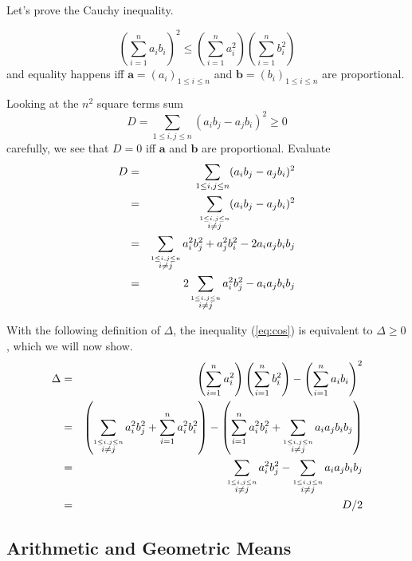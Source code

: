 Let's prove the Cauchy inequality.
\begin{thm} \label{thm:cauchy}
\begin{equation} \label{eq:cos}
 \left(\sum_{i=1}^n a_i b_i\right)^2 \leq
 \left(\sum_{i=1}^n a_i^2\right)
 \left(\sum_{i=1}^n b_i^2\right)
\end{equation}
and equality happens iff
\(\mathbf{a}=(a_i)_{1\leq i\leq n}\)
and
\(\mathbf{b}=(b_i)_{1\leq i\leq n}\)
are proportional.
\end{thm}
\begin{thmproof}
Looking at the \(n^2\) square terms sum
\begin{equation}
D = \sum_{1\leq i,j \leq n} (a_i b_j - a_j b_i)^2 \geq 0
\end{equation}
carefully, we see that \(D=0\) iff
\(\mathbf{a}\) and \(\mathbf{b}\) are proportional.
Evaluate
\begin{eqnarray*}
D
  &=& \sum_{1\leq i,j \leq n} (a_i b_j - a_j b_i)^2 \\
  &=& \sum_{\overset{1\leq i,j \leq n}{i \neq j}} (a_i b_j - a_j b_i)^2 \\
  &=& \sum_{\overset{1\leq i,j \leq n}{i \neq j}} a_i^2 b_j^2 + a_j^2 b_i^2
                             - 2 a_i a_j b_i b_j \\
  &=& 2 \sum_{\overset{1\leq i,j \leq n}{i \neq j}} a_i^2 b_j^2 - a_i a_j b_i b_j \\
\end{eqnarray*}

With the following definition of \(\Delta\), the inequality (\ref{eq:cos})
is equivalent to \(\Delta\geq 0\), which we will now show.
\begin{eqnarray*}
 \Delta
 &=& \left(\sum_{i=1}^n a_i^2\right) \left(\sum_{i=1}^n b_i^2\right) -
     \left(\sum_{i=1}^n a_i b_i\right)^2 \\
 &=& \left(\sum_{\overset{1\leq i,j \leq n}{i \neq j}}{a_i^2 b_j^2} + \sum_{i=1}^n{a_i^2 b_i^2} \right)
     -
     \left(
       \sum_{i=1}^n{a_i^2 b_i^2} +
       \sum_{\overset{1\leq i,j \leq n}{i \neq j}}{a_i a_j b_i b_j}
     \right) \\
 &=& \sum_{\overset{1\leq i,j \leq n}{i \neq j}}{a_i^2 b_j^2} - \sum_{\overset{1\leq i,j \leq n}{i \neq j}}{a_i a_j b_i b_j} \\
 &=& D/2
\end{eqnarray*}
\end{thmproof}


\subsection{Arithmetic and Geometric Means}


